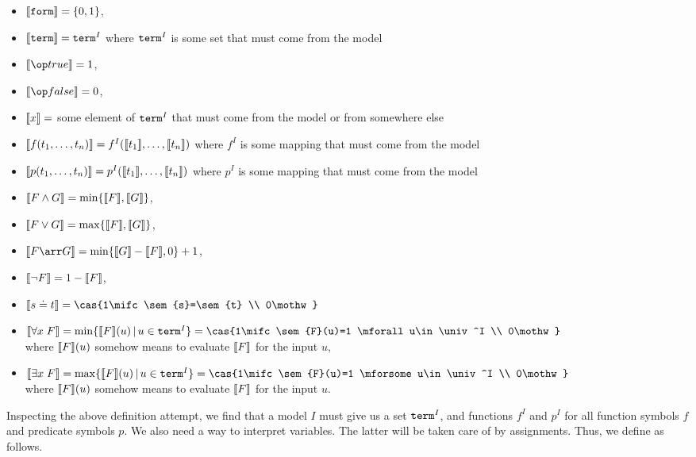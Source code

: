 \begin{itemize}
\item $\llbracket \mathtt{form}\rrbracket=\{0,1\}$,
\item {\color{gray} $\llbracket \mathtt{term}\rrbracket=\mathtt{term}^I$ where $\mathtt{term}^I$ is some set that must come from the model}
\item $\sem{\true} = 1$,
\item $\sem{\false} = 0$,
\item {\color{gray} $\llbracket x\rrbracket=$ some element of $\mathtt{term}^I$ that must come from the model or from somewhere else}
\item {\color{gray} $\llbracket f(t_1,\ldots,t_n)\rrbracket = f^I(\llbracket t_1\rrbracket,\ldots,\llbracket t_n\rrbracket)$ where $f^I$ is some mapping that must come from the model}
\item {\color{gray} $\llbracket p(t_1,\ldots,t_n)\rrbracket = p^I(\llbracket t_1\rrbracket,\ldots,\llbracket t_n\rrbracket)$ where $p^I$ is some mapping that must come from the model}
\item $\llbracket F\wedge G\rrbracket = \min\{\llbracket F\rrbracket,\llbracket G\rrbracket\}$,
\item $\llbracket F\vee G\rrbracket = \max\{\llbracket F\rrbracket,\llbracket G\rrbracket\}$,
\item $\sem{F\arr G} = \min\{\sem{G}-\sem{F},0\}+1$,
\item $\llbracket \neg F\rrbracket = 1-\llbracket F\rrbracket$,
\item $\sem{s\doteq t} = \cas{1\mifc \sem{s}=\sem{t} \\ 0\mothw}$
\item $\sem{\forall x\;F} = \min\{\sem{F}(u) \| u\in \univ^I\}=\cas{1\mifc \sem{F}(u)=1 \mforall u\in \univ^I \\ 0\mothw}$\\
 {\color{gray} where $\llbracket F\rrbracket(u)$ somehow means to evaluate $\llbracket F\rrbracket$ for the input $u$,}
\item $\sem{\exists x\;F} = \max\{\sem{F}(u) \| u\in \univ^I\}=\cas{1\mifc \sem{F}(u)=1 \mforsome u\in \univ^I \\ 0\mothw}$\\
 {\color{gray} where $\llbracket F\rrbracket(u)$ somehow means to evaluate $\llbracket F\rrbracket$ for the input $u$.}
\end{itemize}

Inspecting the above definition attempt, we find that a model $I$ must give us a set $\mathtt{term}^I$, and functions $f^I$ and $p^I$ for all function symbols $f$ and predicate symbols $p$. We also need a way to interpret variables. The latter will be taken care of by assignments. Thus, we define as follows.



